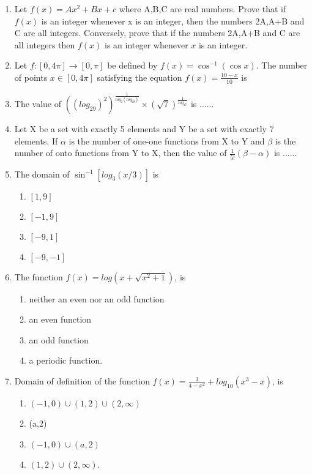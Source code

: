 \begin{enumerate}[label=\arabic*.,ref=\thesubsection.\theenumi]
\item Let $f(x) = Ax^{2}+Bx+c$ where A,B,C are real numbers. Prove that if $f(x)$ is an integer whenever x is an integer, then the numbers 2A,A+B and C are all integers. Conversely, prove that if the numbers 2A,A+B and C are all integers then $f(x)$ is an integer whenever $x$ is an integer.

\item Let $f: [0,4\pi] \rightarrow [0,\pi]$ be defined by $f(x)=\cos^{-1}(\cos x)$. The number of points $x \in [0,4\pi]$ satisfying the equation $f(x)=\frac{10-x}{10}$ is

\item The value of $((log_29)^{2})^{\frac{1}{log_2(log_29)}} \times (\sqrt{7})^{\frac{1}{log_47}}$ is ......

\item Let X be a set with exactly 5 elements and Y be a set with exactly 7 elements. If $\alpha$ is the number of one-one functions from X to Y and $\beta$ is the number of onto functions from Y to X, then the value of $\frac{1}{5!}(\beta-\alpha)$ is ......

\item The domain of $\sin^{-1}[log_3(x/3)]$ is
\begin{enumerate}
\item $[1,9]$
\item $[-1,9]$
\item $[-9,1]$
\item $[-9,-1]$
\end{enumerate}

\item The function $f(x)=log(x+\sqrt{x^{2}+1})$, is
\begin{enumerate}
\item neither an even nor an odd function
\item an even function
\item an odd function
\item a periodic function.
\end{enumerate}

\item Domain of definition of the function $f(x)=\frac{3}{4-x^{2}}+log_{10}(x^{3}-x)$, is
\begin{enumerate}
\item $(-1,0) \cup (1,2) \cup (2,\infty)$
\item (a,2)
\item $(-1,0) \cup (a,2)$
\item $(1,2) \cup (2,\infty)$.
\end{enumerate}


\end{enumerate}
